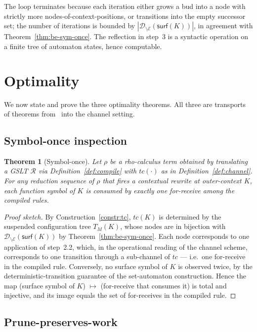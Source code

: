 \documentclass[11pt]{article}
\theoremstyle{plain}
\newtheorem{theorem}{Theorem}[section]
\theoremstyle{definition}
\theoremstyle{remark}
\newcommand{\dom}{\mathcal{D}}
\newcommand{\edges}{\mathcal{E}}
\newcommand{\surface}{\mathsf{surf}}
\begin{document}
\noindent
The loop terminates because each iteration either grows a bud into a node
with strictly more nodes-of-context-positions, or transitions into the
empty successor set; the number of iterations is bounded by
$|\dom_{\setminus\edges}(\surface(K))|$, in agreement with
Theorem~\ref{thm:be-sym-once}. The reflection in step~3 is a
syntactic operation on a finite tree of automaton states, hence
computable.

\section{Optimality}\label{sec:optimality}

We now state and prove the three optimality theorems. All three are
transports of theorems from~\cite{BouwmanErkens2022} into the channel
setting.

\subsection{Symbol-once inspection}

\begin{theorem}[Symbol-once]\label{thm:symbol-once}
Let $\rho$ be a rho-calculus term obtained by translating a GSLT
$\mathcal{R}$ via Definition~\ref{def:compile} with $tc(\cdot)$ as in
Definition~\ref{def:channel}. For any reduction sequence of $\rho$ that
fires a contextual rewrite at outer-context $K$, each function symbol of
$K$ is consumed by exactly one
\textsf{for}-receive among the compiled rules.
\end{theorem}

\begin{proof}[Proof sketch]
By Construction~\ref{constr:tc}, $tc(K)$ is determined by the suspended
configuration tree $T_{M}(K)$, whose nodes are in bijection with
$\dom_{\setminus\edges}(\surface(K))$ by
Theorem~\ref{thm:be-sym-once}. Each node corresponds to one application
of step~2.2, which, in the operational reading of the channel scheme,
corresponds to one transition through a sub-channel of $tc$ --- i.e.\
one for-receive in the compiled rule. Conversely, no surface symbol of
$K$ is observed twice, by the deterministic-transition guarantee of the
set-automaton construction. Hence the map (surface symbol of $K$)
$\mapsto$ (for-receive that consumes it) is total and injective, and
its image equals the set of for-receives in the compiled rule.
\end{proof}

\subsection{Prune-preserves-work}
\end{document}
